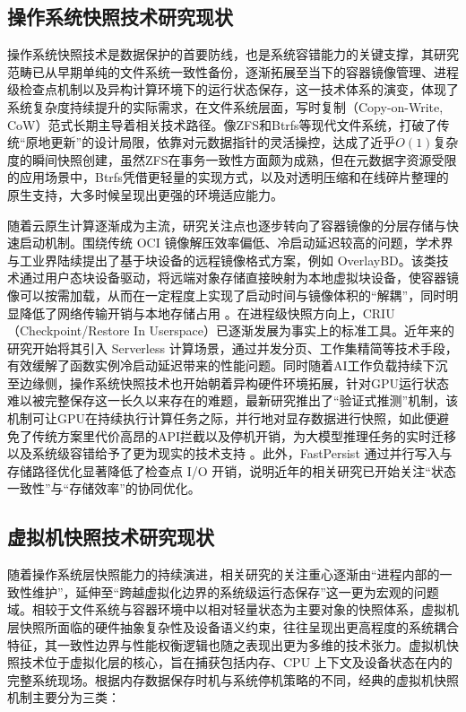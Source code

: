\subsection{操作系统快照技术研究现状}

操作系统快照技术是数据保护的首要防线，也是系统容错能力的关键支撑，其研究范畴已从早期单纯的文件系统一致性备份，逐渐拓展至当下的容器镜像管理、进程级检查点机制以及异构计算环境下的运行状态保存，这一技术体系的演变，体现了系统复杂度持续提升的实际需求，在文件系统层面，写时复制（Copy-on-Write, CoW）范式长期主导着相关技术路径。像ZFS和Btrfs等现代文件系统，打破了传统“原地更新”的设计局限，依靠对元数据指针的灵活操控，达成了近乎$O(1)$复杂度的瞬间快照创建\cite{bonwick2005zfs, rodeh2013btrfs}，虽然ZFS在事务一致性方面颇为成熟，但在元数据字资源受限的应用场景中，Btrfs凭借更轻量的实现方式，以及对透明压缩和在线碎片整理的原生支持，大多时候呈现出更强的环境适应能力\cite{heger2014workload}。

随着云原生计算逐渐成为主流，研究关注点也逐步转向了容器镜像的分层存储与快速启动机制。围绕传统 OCI 镜像解压效率偏低、冷启动延迟较高的问题，学术界与工业界陆续提出了基于块设备的远程镜像格式方案，例如 OverlayBD\cite{overlaybd_dadi}。该类技术通过用户态块设备驱动，将远端对象存储直接映射为本地虚拟块设备，使容器镜像可以按需加载，从而在一定程度上实现了启动时间与镜像体积的“解耦”，同时明显降低了网络传输开销与本地存储占用 \cite{overlaybd_dadi, overlaybd_practice}。在进程级快照方向上，CRIU（Checkpoint/Restore In Userspace）已逐渐发展为事实上的标准工具。近年来的研究开始将其引入 Serverless 计算场景，通过并发分页、工作集精简等技术手段，有效缓解了函数实例冷启动延迟带来的性能问题\cite{panda2023snapstore}。同时随着AI工作负载持续下沉至边缘侧，操作系统快照技术也开始朝着异构硬件环境拓展，针对GPU运行状态难以被完整保存这一长久以来存在的难题，最新研究推出了“验证式推测”机制，该机制可让GPU在持续执行计算任务之际，并行地对显存数据进行快照，如此便避免了传统方案里代价高昂的API拦截以及停机开销，为大模型推理任务的实时迁移以及系统级容错给予了更为现实的技术支持 \cite{phoenixos2025, criugpu2025}。此外，FastPersist 通过并行写入与存储路径优化显著降低了检查点 I/O 开销，说明近年的相关研究已开始关注“状态一致性”与“存储效率”的协同优化\cite{fastpersist2024}。

\subsection{虚拟机快照技术研究现状}

随着操作系统层快照能力的持续演进，相关研究的关注重心逐渐由“进程内部的一致性维护”，延伸至“跨越虚拟化边界的系统级运行态保存”这一更为宏观的问题域。相较于文件系统与容器环境中以相对轻量状态为主要对象的快照体系，虚拟机层快照所面临的硬件抽象复杂性及设备语义约束，往往呈现出更高程度的系统耦合特征，其一致性边界与性能权衡逻辑也随之表现出更为多维的技术张力。虚拟机快照技术位于虚拟化层的核心，旨在捕获包括内存、CPU 上下文及设备状态在内的完整系统现场。根据内存数据保存时机与系统停机策略的不同，经典的虚拟机快照机制主要分为三类：

